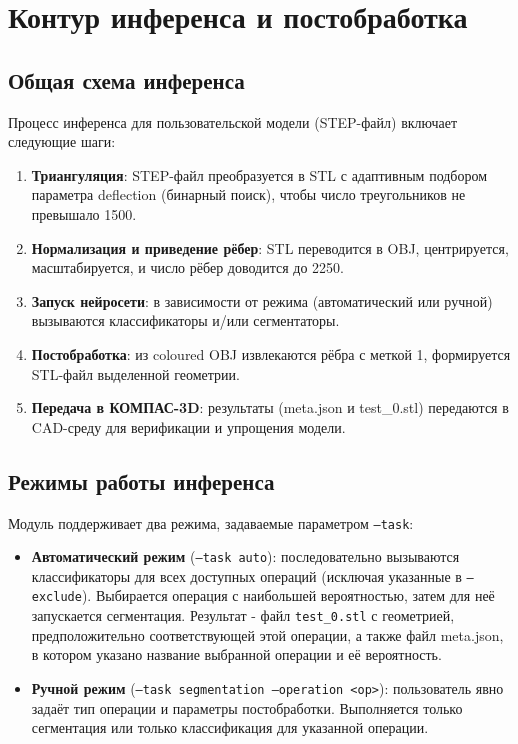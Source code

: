 
\section{Контур инференса и постобработка}

\subsection{Общая схема инференса}
Процесс инференса для пользовательской модели (STEP-файл) включает следующие шаги:

\begin{enumerate}
    \item \textbf{Триангуляция}: STEP-файл преобразуется в STL с адаптивным подбором параметра deflection (бинарный поиск), чтобы число треугольников не превышало 1500.
    \item \textbf{Нормализация и приведение рёбер}: STL переводится в OBJ, центрируется, масштабируется, и число рёбер доводится до 2250.
    \item \textbf{Запуск нейросети}: в зависимости от режима (автоматический или ручной) вызываются классификаторы и/или сегментаторы.
    \item \textbf{Постобработка}: из coloured OBJ извлекаются рёбра с меткой 1, формируется STL-файл выделенной геометрии.
    \item \textbf{Передача в КОМПАС-3D}: результаты (meta.json и test\_0.stl) передаются в CAD-среду для верификации и упрощения модели.
\end{enumerate}

\subsection{Режимы работы инференса}
Модуль поддерживает два режима, задаваемые параметром \texttt{--task}:

\begin{itemize}
    \item \textbf{Автоматический режим} (\texttt{--task auto}): последовательно вызываются классификаторы для всех доступных операций (исключая указанные в \texttt{--exclude}). Выбирается операция с наибольшей вероятностью, затем для неё запускается сегментация. Результат - файл \texttt{test\_0.stl} с геометрией, предположительно соответствующей этой операции, а также файл meta.json, в котором указано название выбранной операции и её вероятность.
    \item \textbf{Ручной режим} (\texttt{--task segmentation --operation <op>}): пользователь явно задаёт тип операции и параметры постобработки. Выполняется только сегментация или только классификация для указанной операции.
\end{itemize}

